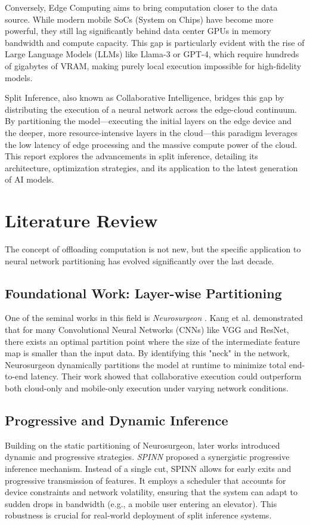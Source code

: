 \documentclass[runningheads]{llncs}
\begin{document}
Conversely, Edge Computing aims to bring computation closer to the data source. While modern mobile SoCs (System on Chips) have become more powerful, they still lag significantly behind data center GPUs in memory bandwidth and compute capacity. This gap is particularly evident with the rise of Large Language Models (LLMs) like Llama-3 or GPT-4, which require hundreds of gigabytes of VRAM, making purely local execution impossible for high-fidelity models.

Split Inference, also known as Collaborative Intelligence, bridges this gap by distributing the execution of a neural network across the edge-cloud continuum. By partitioning the model—executing the initial layers on the edge device and the deeper, more resource-intensive layers in the cloud—this paradigm leverages the low latency of edge processing and the massive compute power of the cloud. This report explores the advancements in split inference, detailing its architecture, optimization strategies, and its application to the latest generation of AI models.

\section{Literature Review}
The concept of offloading computation is not new, but the specific application to neural network partitioning has evolved significantly over the last decade.

\subsection{Foundational Work: Layer-wise Partitioning}
One of the seminal works in this field is \emph{Neurosurgeon} \cite{kang2017neurosurgeon}. Kang et al. demonstrated that for many Convolutional Neural Networks (CNNs) like VGG and ResNet, there exists an optimal partition point where the size of the intermediate feature map is smaller than the input data. By identifying this "neck" in the network, Neurosurgeon dynamically partitions the model at runtime to minimize total end-to-end latency. Their work showed that collaborative execution could outperform both cloud-only and mobile-only execution under varying network conditions.

\subsection{Progressive and Dynamic Inference}
Building on the static partitioning of Neurosurgeon, later works introduced dynamic and progressive strategies. \emph{SPINN} \cite{laskaridis2020spinn} proposed a synergistic progressive inference mechanism. Instead of a single cut, SPINN allows for early exits and progressive transmission of features. It employs a scheduler that accounts for device constraints and network volatility, ensuring that the system can adapt to sudden drops in bandwidth (e.g., a mobile user entering an elevator). This robustness is crucial for real-world deployment of split inference systems.
\end{document}
